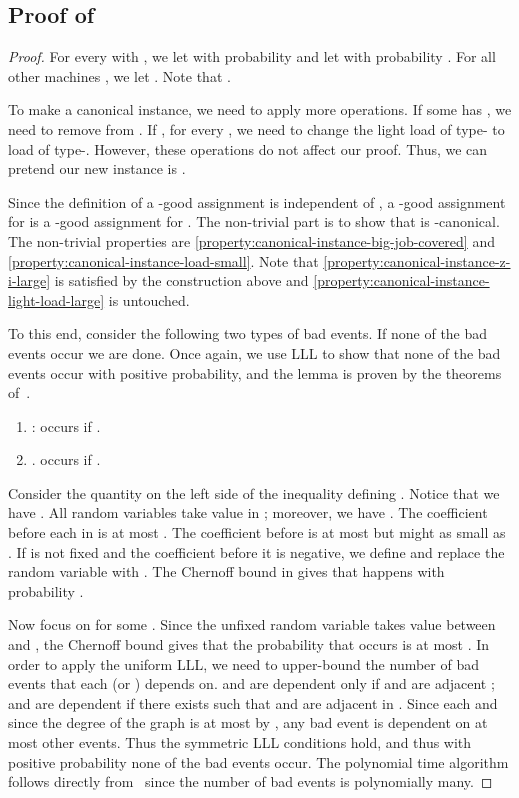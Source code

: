 \documentclass[11pt]{article}
\newcounter{prop}
\begin{document}
\subsection{Proof of }
\label{app:reducing-p-and-q-2}
\reducep*
\begin{proof}
For every  with , we let  with probability  and let  with probability . For all other machines , we let .  Note that . 

To make  a canonical instance, we need to apply more operations. If some  has , we need to remove  from . If , for every , we need to change the  light load of type- to load of type-.  However, these operations do not affect our proof. Thus, we can pretend our new instance is .

Since the definition of a -good assignment is independent of ,  a -good assignment for  is a -good assignment for . The non-trivial part is to show that  is -canonical. The non-trivial properties are  \ref{property:canonical-instance-big-job-covered} and \ref{property:canonical-instance-load-small}. Note that \ref{property:canonical-instance-z-i-large} is satisfied by the construction above and \ref{property:canonical-instance-light-load-large} is untouched.

To this end, consider the following two types of bad events. If none of the bad events occur we are done. Once again, we use LLL to show that none of the bad events occur with positive probability, and the lemma is proven by the theorems of~\cite{MT10,HSS11}.
\begin{enumerate}
 \item :  occurs if .
 
\item .  occurs if .
\end{enumerate}

Consider the quantity  on the left side of the inequality defining . Notice that we have .  All random variables  take value in ; moreover, we have .   The coefficient before each  in  is at most . The coefficient before  is at most  but might as small as . If  is not fixed and the coefficient before it is negative, we define  and replace the random variable  with . The Chernoff bound in  gives that  happens with probability
.

Now focus on  for some .  Since the unfixed random variable  takes value between  and , the Chernoff bound gives that the probability that  occurs is at most .
In order to apply the uniform LLL,  we need to upper-bound the number of bad events that each  (or ) depends on.  
 and  are dependent only if  and  are adjacent ;  and  are dependent if there exists  such that  and  are adjacent in . 
Since each  and  since the degree of the graph  is at most  by ,  any bad event is dependent on at most  other events.  Thus the symmetric LLL conditions hold, and thus with positive probability none of the bad events occur.
The polynomial time algorithm follows directly from~\cite{MT10} since the number of bad events is polynomially many.
\end{proof}
\end{document}
